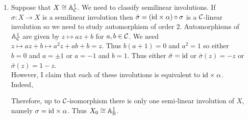 \documentclass[12pt]{article}
\begin{document}
\begin{enumerate}
\item Suppose that $X \cong \mathbb{A}^1_{\mathcal{C}}$. We need to classify semilinear involutions. If $\sigma : X \to X$ is a semilinear involution then $\bar{\sigma} = (\mathrm{id} \times \alpha) \circ \sigma$ is a $\mathcal{C}$-linear involution so we need to study automorphism of order $2$. Automorphisms of $\mathbb{A}^1_{\mathcal{C}}$ are given by $z \mapsto az + b$ for $a, b \in \mathcal{C}$. We need $z \mapsto az + b \mapsto a^2 z + ab + b = z$. Thus $b(a + 1) = 0$ and $a^2 = 1$ so either $b = 0$ and $a = \pm 1$ or $a = -1$ and $b = 1$. Thus either $\bar{\sigma} = \mathrm{id}$ or $\bar{\sigma}(z) = -z$ or $\bar{\sigma}(z) = 1 - z$.
\bigskip\\
However, I claim that each of these involutions is equivalent to $\mathrm{id} \times \alpha$. Indeed,

\begin{center}
\qquad
{}
\end{center}
Therefore, up to $\mathcal{C}$-isomorphism there is only one semi-linear involution of $X$, namely $\sigma = \mathrm{id} \times \alpha$. Thus $X_0 \cong \mathbb{A}^1_{\mathbb{R}}$.


\end{enumerate}
\end{document}

